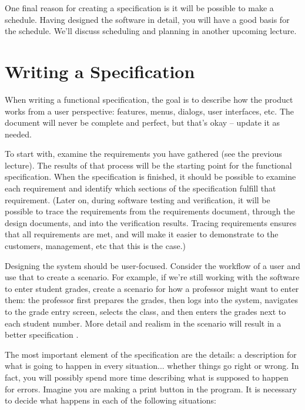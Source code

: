 One final reason for creating a specification is it will be possible to make a schedule. Having designed the software in detail, you will have a good basis for the schedule. We'll discuss scheduling and planning in another upcoming lecture.

\section*{Writing a Specification}

When writing a functional specification, the goal is to describe how the product works from a user perspective: features, menus, dialogs, user interfaces, etc. The document will never be complete and perfect, but that's okay -- update it as needed.

To start with, examine the requirements you have gathered (see the previous lecture). The results of that process will be the starting point for the functional specification. When the specification is finished, it should be possible to examine each requirement and identify which sections of the specification fulfill that requirement. (Later on, during software testing and verification, it will be possible to trace the requirements from the requirements document, through the design documents, and into the verification results. Tracing requirements ensures that all requirements are met, and will make it easier to demonstrate to the customers, management, etc that this is the case.)


Designing the system should be user-focused. Consider the workflow of a user and use that to create a scenario. For example, if we're still working with the software to enter student grades, create a scenario for how a professor might want to enter them: the professor first prepares the grades, then logs into the system, navigates to the grade entry screen, selects the class, and then enters the grades next to each student number. More detail and realism in the scenario will result in a better specification \cite{spolsky:fs2}.

The most important element of the specification are the details: a description for what is going to happen in every situation... whether things go right or wrong. In fact, you will possibly spend more time describing what is supposed to happen for errors.  Imagine you are making a print button in the program. It is necessary to decide what happens in each of the following situations: 

